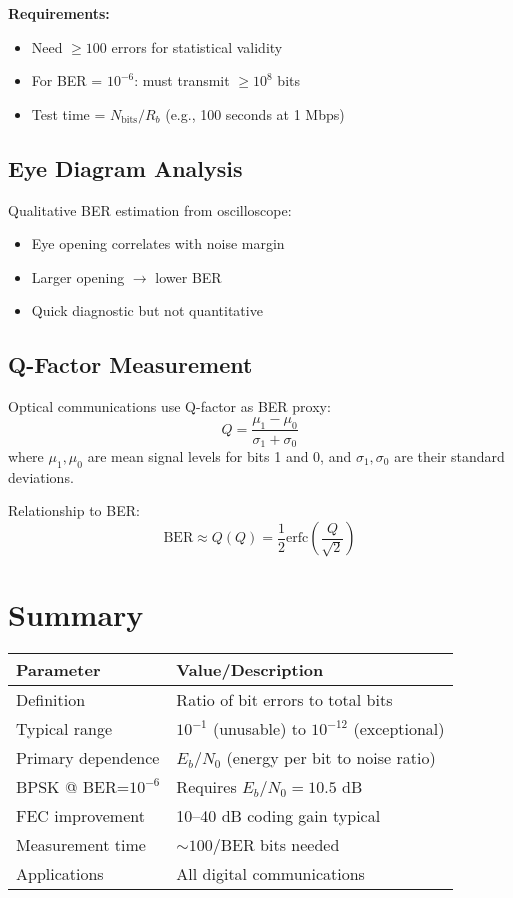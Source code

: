 \textbf{Requirements:}
\begin{itemize}
\item Need $\geq 100$ errors for statistical validity
\item For BER = $10^{-6}$: must transmit $\geq 10^8$ bits
\item Test time = $N_{\mathrm{bits}} / R_b$ (e.g., 100 seconds at 1 Mbps)
\end{itemize}

\subsection{Eye Diagram Analysis}

Qualitative BER estimation from oscilloscope:
\begin{itemize}
\item Eye opening correlates with noise margin
\item Larger opening $\rightarrow$ lower BER
\item Quick diagnostic but not quantitative
\end{itemize}

\subsection{Q-Factor Measurement}

Optical communications use Q-factor as BER proxy:
\begin{equation}
Q = \frac{\mu_1 - \mu_0}{\sigma_1 + \sigma_0}
\label{eq:q-factor}
\end{equation}
where $\mu_1, \mu_0$ are mean signal levels for bits 1 and 0, and $\sigma_1, \sigma_0$ are their standard deviations.

Relationship to BER:
\begin{equation}
\mathrm{BER} \approx Q(Q) = \frac{1}{2}\mathrm{erfc}\left(\frac{Q}{\sqrt{2}}\right)
\label{eq:ber-q-factor}
\end{equation}

\section{Summary}

\begin{center}
\begin{tabular}{@{}ll@{}}
\toprule
\textbf{Parameter} & \textbf{Value/Description} \\
\midrule
Definition & Ratio of bit errors to total bits \\
Typical range & $10^{-1}$ (unusable) to $10^{-12}$ (exceptional) \\
Primary dependence & $E_b/N_0$ (energy per bit to noise ratio) \\
BPSK @ BER=$10^{-6}$ & Requires $E_b/N_0 = 10.5$ dB \\
FEC improvement & 10--40 dB coding gain typical \\
Measurement time & $\sim 100/\mathrm{BER}$ bits needed \\
Applications & All digital communications \\
\bottomrule
\end{tabular}
\end{center}

